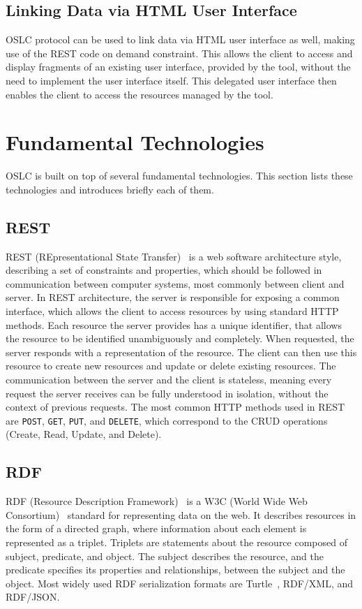 \subsection*{Linking Data via HTML User Interface}
\label {sec:oslc_linking_data_via_html_user_interface}
OSLC protocol can be used to link data via HTML user interface as well, making use of the REST code on demand constraint. This allows the client to access and display fragments of an existing user interface, provided by the tool, without the need to implement the user interface itself. This delegated user interface then enables the client to access the resources managed by the tool.

\section{Fundamental Technologies}
\label {sec:oslc_fundamental_technologies}
OSLC is built on top of several fundamental technologies. This section lists these technologies and introduces briefly each of them.

\subsection*{REST}
REST (REpresentational State Transfer) \cite{rest} is a web software architecture style, describing a set of constraints and properties, which should be followed in communication between computer systems, most commonly between client and server. In REST architecture, the server is responsible for exposing a common interface, which allows the client to access resources by using standard HTTP methods. Each resource the server provides has a unique identifier, that allows the resource to be identified unambiguously and completely. When requested, the server responds with a representation of the resource. The client can then use this resource to create new resources and update or delete existing resources. The communication between the server and the client is stateless, meaning every request the server receives can be fully understood in isolation, without the context of previous requests. The most common HTTP methods used in REST are \texttt{POST}, \texttt{GET}, \texttt{PUT}, and \texttt{DELETE}, which correspond to the CRUD operations (Create, Read, Update, and Delete).

\subsection*{RDF}
RDF (Resource Description Framework) \cite{rdf} is a W3C (World Wide Web Consortium) \cite{w3c} standard for representing data on the web. It describes resources in the form of a directed graph, where information about each element is represented as a triplet. Triplets are statements about the resource composed of subject, predicate, and object. The subject describes the resource, and the predicate specifies its properties and relationships, between the subject and the object. Most widely used RDF serialization formats are Turtle \cite{turtle}, RDF/XML, and RDF/JSON.

